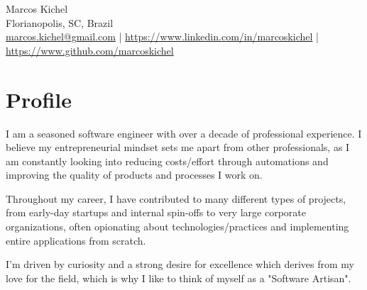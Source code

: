 \documentclass[11pt, a4paper]{article}
\begin{document}
\begin{center}
    {\Huge Marcos Kichel}\\
    \vspace{0.2cm}
    Florianopolis, SC, Brazil\\
    \href{mailto:marcos.kichel@gmail.com}{marcos.kichel@gmail.com} | \href{https://www.linkedin.com/in/marcoskichel/}{https://www.linkedin.com/in/marcoskichel} | \href{https://www.github.com/marcoskichel}{https://www.github.com/marcoskichel}
\end{center}

\section*{Profile}
\begin{flushleft}
I am a seasoned software engineer with over a decade of professional experience. 
I believe my entrepreneurial mindset sets me apart from other professionals, 
as I am constantly looking into reducing costs/effort through automations and improving the quality of products and processes I work on.\\
\end{flushleft}

\begin{flushleft}
Throughout my career, I have contributed to many different types of projects, from early-day startups and internal spin-offs to
very large corporate organizations, often opionating about technologies/practices and implementing entire applications from scratch.\\
\end{flushleft}

\begin{flushleft}
  I'm driven by curiosity and a strong desire for excellence which derives from my love 
  for the field, which is why I like to think of myself as a "Software Artisan".
\end{flushleft}
\end{document}
